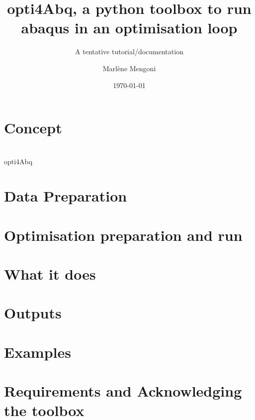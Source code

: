 \documentclass[t]{beamer}
\title[opti4Abq - A tentative tutorial/documentation]{opti4Abq, a python toolbox to run abaqus in an optimisation loop}
\subtitle{A tentative tutorial/documentation}
\date{\today}
\author{Marl\`ene Mengoni}
\institute[IMBE]{
	\href{mailto:m.mengoni@leeds.ac.uk}{m.mengoni@leeds.ac.uk}\\
}
\begin{document}
\titleframe

\section[Background]{Concept}


\section[]{}
\begin{frame}{opti4Abq}%
  \myToc
\end{frame}
\section{Data Preparation}



\section[Optimisation process]{Optimisation preparation and run}




\section{What it does}


\section{Outputs}


\section{Examples}

\section[Citation]{Requirements and Acknowledging the toolbox}




\end{document}
